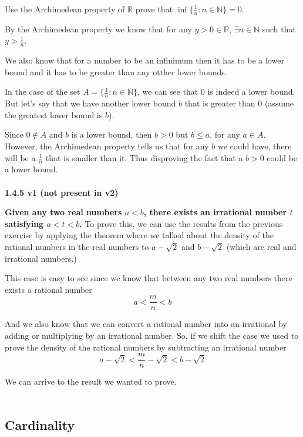 Use the Archimedean property of $\mathbb{R}$ prove that $\inf \{ \frac{1}{n} : n \in \mathbb{N} \} = 0$.

By the Archimedean property we know that for any $y>0 \in \mathbb{R}$, $\exists n \in \mathbb{N}$ such that
$y > \frac{1}{n}$.

We also know that for a number to be an infinimum then it has to be a lower bound and it has to be greater than any
otther lower bounds.

In the case of the set $A = \{ \frac{1}{n} : n \in \mathbb{N} \}$, we can see that 0 is indeed a lower bound.
But let's say that we have another lower bound $b$ that is greater than 0 (assume the greatest lower bound is $b$).

Since $0 \notin A$ and $b$ is a lower bound, then $b > 0$ but $b \leq a$, for any $a \in A$.
However, the Archimedean property tells us that for any $b$ we could have, there will be a $\frac{1}{n}$ that is smaller than it.
Thus disproving the fact that a $b>0$ could be a lower bound.
\\~\\


\label{abbott:1.4.5}
\textbf{1.4.5 v1 (not present in v2)}

\textbf{Given any two real numbers $a < b$, there exists an irrational number $t$ satisfying $a < t < b$.}
To prove this, we can use the results from the previous exercise by applying the theorem where we talked about the
density of the rational numbers in the real numbers to $a - \sqrt{2}$ and $b - \sqrt{2}$
(which are real and irrational numbers.)

This case is easy to see since we know that between any two real numbers there exists a rational number
$$
a < \frac{m}{n} < b
$$

And we also know that we can convert a rational number into an irrational by adding or multiplying by an irrational number.
So, if we shift the case we used to prove the density of the rational numbers by subtracting an irrational number
$$
a - \sqrt{2} < \frac{m}{n} - \sqrt{2} < b - \sqrt{2}
$$

We can arrive to the result we wanted to prove.
\\~\\




\subsection{Cardinality}

